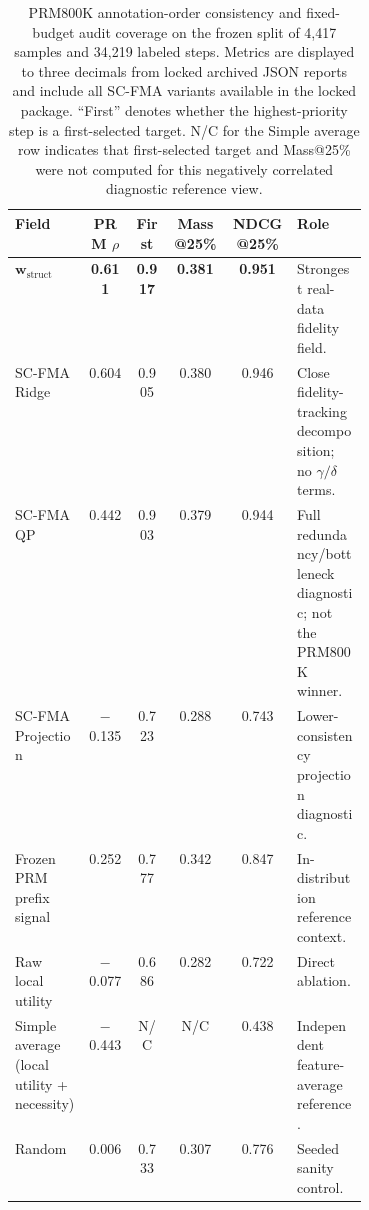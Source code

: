 \documentclass[a4paper,fleqn]{cas-sc}
\newcommand{\wstruct}{\ensuremath{\mathbf{w}_{\mathrm{struct}}}}
\begin{document}
\begin{table}[ht]
\caption{PRM800K annotation-order consistency and fixed-budget audit coverage on the frozen split of 4,417 samples and 34,219 labeled steps. Metrics are displayed to three decimals from locked archived JSON reports and include all SC-FMA variants available in the locked package. ``First'' denotes whether the highest-priority step is a first-selected target. N/C for the Simple average row indicates that first-selected target and Mass@25\% were not computed for this negatively correlated diagnostic reference view.}
\label{tab:prm800k-audit}
\centering
\scriptsize
\renewcommand{\arraystretch}{1.08}
\begin{tabular}{Z{0.21\linewidth}ccccZ{0.20\linewidth}}
\toprule
\textbf{Field} & \textbf{PRM $\rho$} & \textbf{First} & \textbf{Mass@25\%} & \textbf{NDCG@25\%} & \textbf{Role} \\
\midrule
\wstruct{} & \textbf{0.611} & \textbf{0.917} & \textbf{0.381} & \textbf{0.951} & Strongest real-data fidelity field. \\
SC-FMA Ridge & 0.604 & 0.905 & 0.380 & 0.946 & Close fidelity-tracking decomposition; no $\gamma/\delta$ terms. \\
SC-FMA QP & 0.442 & 0.903 & 0.379 & 0.944 & Full redundancy/bottleneck diagnostic; not the PRM800K winner. \\
SC-FMA Projection & $-$0.135 & 0.723 & 0.288 & 0.743 & Lower-consistency projection diagnostic. \\
Frozen PRM prefix signal & 0.252 & 0.777 & 0.342 & 0.847 & In-distribution reference context. \\
Raw local utility & $-$0.077 & 0.686 & 0.282 & 0.722 & Direct ablation. \\
Simple average (local utility + necessity) & $-$0.443 & N/C & N/C & 0.438 & Independent feature-average reference. \\
Random & 0.006 & 0.733 & 0.307 & 0.776 & Seeded sanity control. \\
\bottomrule
\end{tabular}
\end{table}
\end{document}
